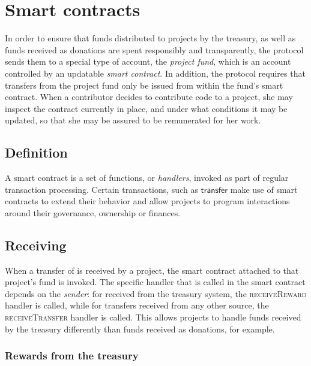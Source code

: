 \section{Smart contracts}
\label{s:smart-contracts}

\newcommand{\handler}[1]{\textsc{\small#1}}

In order to ensure that funds distributed to projects by the \oscoin{}
treasury, as well as funds received as donations are spent responsibly and
transparently, the protocol sends them to a special type of account, the
\emph{project fund}, which is an account controlled by an updatable \emph{smart
contract}.
In addition, the protocol requires that transfers from the project fund only be
issued from within the fund's smart contract. When a contributor decides to
contribute code to a project, she may inspect the contract currently in place,
and under what conditions it may be updated, so that she may be assured to be
remunerated for her work.

\subsection{Definition}
A smart contract is a set of functions, or \emph{handlers}, invoked as part
of regular transaction processing. Certain transactions, such as $\mathsf{transfer}$
make use of smart contracts to extend their behavior and allow projects to
program interactions around their governance, ownership or finances.

\subsection{Receiving \oscoin{}}

When a transfer of \oscoin{} is received by a project, the smart contract
attached to that project's fund is invoked. The specific handler that is
called in the smart contract depends on the \emph{sender}: for \oscoin{} received
from the treasury system, the \handler{receiveReward} handler is called, while
for transfers received from any other source, the \handler{receiveTransfer}
handler is called. This allows projects to handle funds received by the treasury
differently than funds received as donations, for example.

\subsubsection{Rewards from the treasury}


